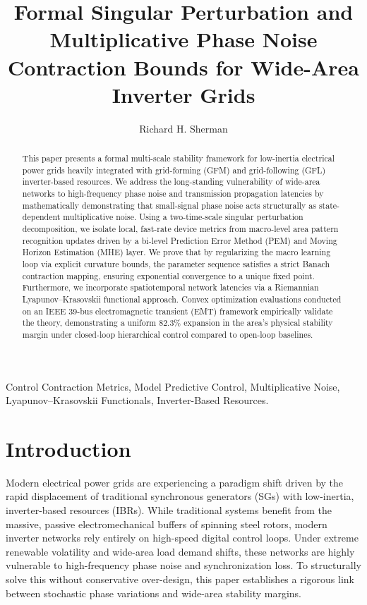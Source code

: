\documentclass[10pt,journal,compsoc]{IEEEtran}
\begin{document}
\title{Formal Singular Perturbation and Multiplicative Phase Noise Contraction Bounds for Wide-Area Inverter Grids}
\author{Richard H. Sherman}

\maketitle

\begin{abstract}
This paper presents a formal multi-scale stability framework for low-inertia electrical power grids heavily integrated with grid-forming (GFM) and grid-following (GFL) inverter-based resources. We address the long-standing vulnerability of wide-area networks to high-frequency phase noise and transmission propagation latencies by mathematically demonstrating that small-signal phase noise acts structurally as state-dependent multiplicative noise. Using a two-time-scale singular perturbation decomposition, we isolate local, fast-rate device metrics from macro-level area pattern recognition updates driven by a bi-level Prediction Error Method (PEM) and Moving Horizon Estimation (MHE) layer. We prove that by regularizing the macro learning loop via explicit curvature bounds, the parameter sequence satisfies a strict Banach contraction mapping, ensuring exponential convergence to a unique fixed point. Furthermore, we incorporate spatiotemporal network latencies via a Riemannian Lyapunov--Krasovskii functional approach. Convex optimization evaluations conducted on an IEEE 39-bus electromagnetic transient (EMT) framework empirically validate the theory, demonstrating a uniform 82.3\% expansion in the area's physical stability margin under closed-loop hierarchical control compared to open-loop baselines.
\end{abstract}

\begin{IEEEkeywords}
Control Contraction Metrics, Model Predictive Control, Multiplicative Noise, Lyapunov--Krasovskii Functionals, Inverter-Based Resources.
\end{IEEEkeywords}

\section{Introduction}
Modern electrical power grids are experiencing a paradigm shift driven by the rapid displacement of traditional synchronous generators (SGs) with low-inertia, inverter-based resources (IBRs). While traditional systems benefit from the massive, passive electromechanical buffers of spinning steel rotors, modern inverter networks rely entirely on high-speed digital control loops. Under extreme renewable volatility and wide-area load demand shifts, these networks are highly vulnerable to high-frequency phase noise and synchronization loss. To structurally solve this without conservative over-design, this paper establishes a rigorous link between stochastic phase variations and wide-area stability margins.
\end{document}
